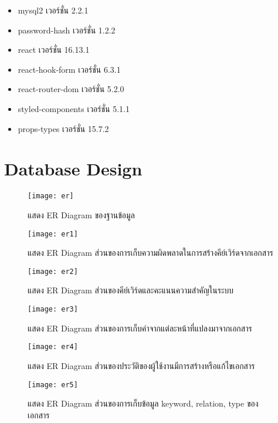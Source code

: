 \begin{enumerate}
\begin{itemize}
		        \item mysql2 เวอร์ชั่น 2.2.1
		        \item password-hash เวอร์ชั่น 1.2.2
		        \item react เวอร์ชั่น 16.13.1
		        \item react-hook-form เวอร์ชั่น 6.3.1
		        \item react-router-dom เวอร์ชั่น 5.2.0
		        \item styled-components เวอร์ชั่น 5.1.1
		        \item props-types เวอร์ชั่น 15.7.2
            \end{itemize}
        \end{enumerate}
		
\section{Database Design}

\begin{figure}[H]
    \centering
    \texttt{[image: er]}
    \caption{แสดง ER Diagram ของฐานข้อมูล}\label{fig:er}
\end{figure}


\begin{figure}[H]
    \centering
    \texttt{[image: er1]}
    \caption{แสดง ER Diagram ส่วนของการเก็บความผิดพลาดในการสร้างคีย์เวิร์ดจากเอกสาร}\label{fig:er1}
\end{figure}


\begin{figure}[H]
    \centering
    \texttt{[image: er2]}
    \caption{แสดง ER Diagram ส่วนของคีย์เวิร์ดและคะแนนความสำคัญในระบบ}\label{fig:er2}
\end{figure}


\begin{figure}[H]
    \centering
    \texttt{[image: er3]}
    \caption{แสดง ER Diagram ส่วนของการเก็บคำจากแต่ละหน้าที่แปลงมาจากเอกสาร}\label{fig:er3}
\end{figure}


\begin{figure}[H]
    \centering
    \texttt{[image: er4]}
    \caption{แสดง ER Diagram ส่วนของประวัติของผู้ใช้งานมีการสร้างหรือแก้ไขเอกสาร}\label{fig:er4}
\end{figure}



\begin{figure}[H]
    \centering
    \texttt{[image: er5]}
    \caption{แสดง ER Diagram ส่วนของการเก็บข้อมูล keyword, relation, type ของเอกสาร}\label{fig:er5}
\end{figure}



